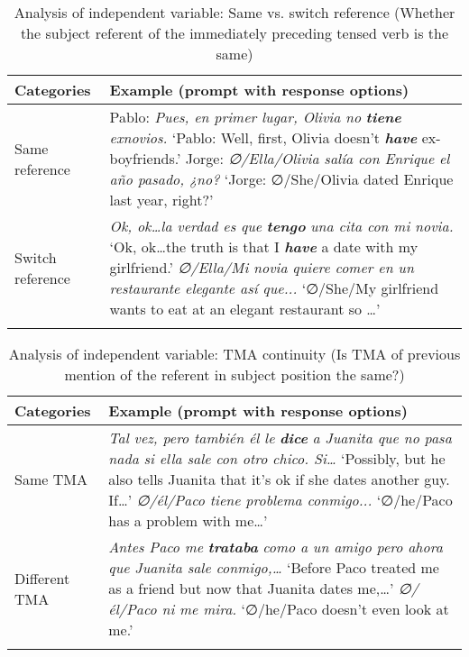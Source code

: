 \documentclass[output=paper]{langscibook}
\begin{document}
\begin{table}
\begin{tabularx}{\textwidth}{lQ}
 \lsptoprule
 Categories & {Example (prompt with response options)}\\\midrule
 Same reference & { Pablo: \textit{Pues, en primer lugar, Olivia no} \textbf{\textit{tiene}} \textit{exnovios.} }\newline
 {‘Pablo: Well, first, Olivia doesn’t \textbf{\textit{have}} ex{}-boyfriends.’}\newline
 {Jorge: \textit{∅/Ella/Olivia salía con Enrique el año pasado, ¿no?}}\newline
 {‘Jorge: ∅/She/Olivia dated Enrique last year, right?’}\\
 \midrule
  Switch reference & {\textit{Ok, ok…la verdad es que} \textbf{\textit{tengo}} \textit{una cita con mi novia.}}\newline
 {‘Ok, ok…the truth is that I \textbf{\textit{have}} a date with my girlfriend.’}\newline
 {\itshape ∅/Ella/Mi novia quiere comer en \pagebreak un restaurante elegante así que...}\newline
 {‘∅/She/My girlfriend wants to eat at an elegant restaurant so …’}\\
 \lspbottomrule
 \end{tabularx}
\caption{Analysis of independent variable: Same vs. switch reference (Whether the subject referent of the immediately preceding tensed verb is the same)}
\label{tab:geeslin:3}
\end{table}

\begin{table}
\begin{tabularx}{\textwidth}{lQ}
 \lsptoprule
 Categories & {Example (prompt with response options)}\\\midrule
 Same TMA & {\textit{Tal vez, pero también él le} }{\textbf{\textit{dice}}}{ \textit{a Juanita que no pasa nada si ella sale con otro chico. Si…}}\newline
 {‘Possibly, but he also tells Juanita that it’s ok if she dates another guy. If…’}\newline
 {\itshape ∅/él/Paco tiene problema conmigo...}\newline
 {‘∅/he/Paco has a problem with me…’}\\
 \midrule
  Different TMA & {\textit{Antes Paco me} }{\textbf{\textit{trataba}}}{ \textit{como a un amigo pero ahora que Juanita sale conmigo,…}}\newline
 {‘Before Paco treated me as a friend but now that Juanita dates me,…’} \newline
 {\itshape ∅/él/Paco ni me mira.}\newline
 {‘∅/he/Paco doesn’t even look at me.’}\\
 \lspbottomrule
\end{tabularx}
\caption{Analysis of independent variable: TMA continuity (Is TMA of previous mention of the referent in subject position the same?)}
\label{tab:geeslin:4}
\end{table}
\end{document}

